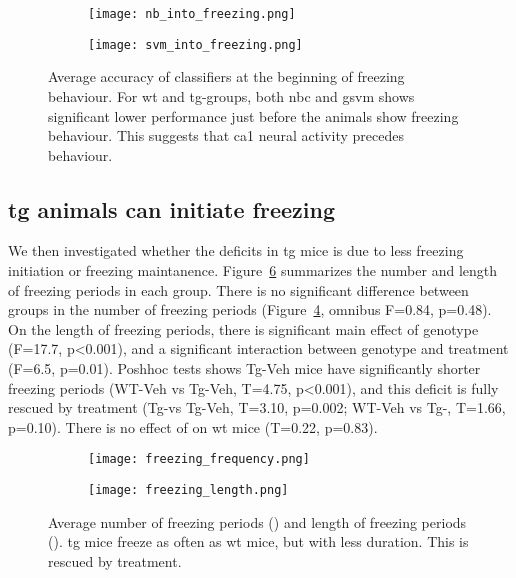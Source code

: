 \begin{figure}[h]
    \begin{subfigure}[h]{\textwidth}
        \texttt{[image: nb\_into\_freezing.png]}
        \caption{\label{f.ad.nb_into_f}}
    \end{subfigure}
    \begin{subfigure}[h]{\textwidth}
        \texttt{[image: svm\_into\_freezing.png]}
        \caption{\label{f.ad.svm_into_f}}
    \end{subfigure}
    \caption{Average accuracy of classifiers at the beginning of freezing behaviour. For \gls{wt} and \gls{tg}-\glu groups, both \gls{nbc} and \gls{gsvm} shows significant lower performance just before the animals show freezing behaviour. This suggests that \gls{ca1} neural activity precedes behaviour.\label{f.ad.into_f}}
\end{figure}


\subsection{\Gls{tg} animals can initiate freezing}
We then investigated whether the deficits in \gls{tg} mice is due to less freezing initiation or freezing maintanence. Figure~\ref{f.ad.freezing_profile} summarizes the number and length of freezing periods in each group. There is no significant difference between groups in the number of freezing periods (Figure~\ref{f.ad.freezing_freq}, omnibus F=0.84, p=0.48). On the length of freezing periods, there is significant main effect of genotype (F=17.7, p<0.001), and a significant interaction between genotype and treatment (F=6.5, p=0.01). Poshhoc tests shows Tg-Veh mice have significantly shorter freezing periods (WT-Veh vs Tg-Veh, T=4.75, p<0.001), and this deficit is fully rescued by \tglu treatment (Tg-\glu vs Tg-Veh, T=3.10, p=0.002; WT-Veh vs Tg-\glu, T=1.66, p=0.10). There is no effect of \tglu on \gls{wt} mice (T=0.22, p=0.83). 

\begin{figure}[h]
    \begin{subfigure}[h]{\textwidth}
        \texttt{[image: freezing\_frequency.png]}
        \caption{\label{f.ad.freezing_freq}}
    \end{subfigure}
    \begin{subfigure}[h]{\textwidth}
        \texttt{[image: freezing\_length.png]}
        \caption{\label{f.ad.freezing_length}}
    \end{subfigure}
    \caption{Average number of freezing periods () and length of freezing periods (). \Gls{tg} mice freeze as often as \gls{wt} mice, but with less duration. This is rescued by \tglu treatment. \label{f.ad.freezing_profile}}
\end{figure}




